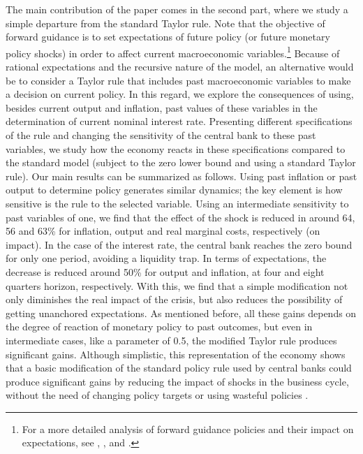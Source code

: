 \documentclass[11pt]{article}
\numberwithin{equation}{section}
\begin{document}
The main contribution of the paper comes in the second part, where we study a simple departure from the standard Taylor rule. Note that the objective of forward guidance is to set expectations of future policy (or future monetary policy shocks) in order to affect current macroeconomic variables.\footnote{For a more detailed analysis of forward guidance policies and their impact on expectations, see \cite{CampbellEtAl2012}, \cite{AndradeEtAl2015}, \cite{BachmannEtAl2015} and \cite{AngeletosEtAl2016}.} Because of rational expectations and the recursive nature of the model, an alternative would be to consider a Taylor rule that includes past macroeconomic variables to make a decision on current policy. In this regard, we explore the consequences of using, besides current output and inflation, past values of these variables in the determination of current nominal interest rate. Presenting different specifications of the rule and changing the sensitivity of the central bank to these past variables, we study how the economy reacts in these specifications compared to the standard model (subject to the zero lower bound and using a standard Taylor rule). Our main results can be summarized as follows. Using past inflation or past output to determine policy generates similar dynamics; the key element is how sensitive is the rule to the selected variable. Using an intermediate sensitivity to past variables of one, we find that the effect of the shock is reduced in around 64, 56 and 63\% for inflation, output and real marginal costs, respectively (on impact). In the case of the interest rate, the central bank reaches the zero bound for only one period, avoiding a liquidity trap. In terms of expectations, the decrease is reduced around 50\% for output and inflation, at four and eight quarters horizon, respectively. With this, we find that a simple modification not only diminishes the real impact of the crisis, but also reduces the possibility of getting unanchored expectations. As mentioned before, all these gains depends on the degree of reaction of monetary policy to past outcomes, but even in intermediate cases, like a parameter of 0.5, the modified Taylor rule produces significant gains. Although simplistic, this representation of the economy shows that a basic modification of the standard policy rule used by central banks could produce significant gains by reducing the impact of shocks in the business cycle, without the need of changing policy targets \citep{CoibionEtAl2012} or using wasteful policies \citep{CorreiaEtAl2013}.
\end{document}
